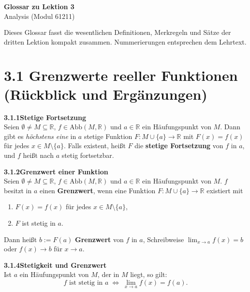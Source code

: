 \documentclass[a4paper,12pt]{article}
\newcommand{\gentry}[3]{%
  \noindent\textbf{#1\quad #2}\nopagebreak\\[0.2em]
  #3\par\smallskip
}
\begin{document}
\begin{center}
  {\LARGE\bfseries Glossar zu Lektion 3}\\[0.5em]
  {\large Analysis (Modul 61211)}
\end{center}

\vspace{1em}

Dieses Glossar fasst die wesentlichen Definitionen, Merkregeln und S\"atze
der dritten Lektion kompakt zusammen. Nummerierungen entsprechen dem Lehrtext.

\section*{3.1 \quad Grenzwerte reeller Funktionen (R\"uckblick und Erg\"anzungen)}

\gentry{3.1.1}{Stetige Fortsetzung}{%
  Seien $\emptyset \neq M \subseteq \mathbb{R}$, $f \in \mathrm{Abb}(M, \mathbb{R})$ und
  $a \in \mathbb{R}$ ein H\"aufungspunkt von $M$. Dann gibt es \emph{h\"ochstens eine}
  in $a$ stetige Funktion $F : M \cup \{a\} \to \mathbb{R}$ mit
  $F(x) = f(x)$ f\"ur jedes $x \in M \setminus \{a\}$. Falls existent, hei{\ss}t $F$
  die \textbf{stetige Fortsetzung} von $f$ in $a$, und $f$ hei{\ss}t nach $a$
  stetig fortsetzbar.
}

\gentry{3.1.2}{Grenzwert einer Funktion}{%
  Seien $\emptyset \neq M \subseteq \mathbb{R}$, $f \in \mathrm{Abb}(M, \mathbb{R})$ und
  $a \in \mathbb{R}$ ein H\"aufungspunkt von $M$. $f$ besitzt in $a$ einen
  \textbf{Grenzwert}, wenn eine Funktion $F : M \cup \{a\} \to \mathbb{R}$ existiert mit
  \begin{enumerate}[label=(\roman*),topsep=2pt,itemsep=1pt]
    \item $F(x) = f(x)$ f\"ur jedes $x \in M \setminus \{a\}$,
    \item $F$ ist stetig in $a$.
  \end{enumerate}
  Dann hei{\ss}t $b := F(a)$ \textbf{Grenzwert} von $f$ in $a$, Schreibweise
  $\lim_{x \to a} f(x) = b$ oder $f(x) \to b$ f\"ur $x \to a$.
}

\gentry{3.1.4}{Stetigkeit und Grenzwert}{%
  Ist $a$ ein H\"aufungspunkt von $M$, der in $M$ liegt, so gilt:
  \[
    f \text{ ist stetig in } a \;\Longleftrightarrow\; \lim_{x \to a} f(x) = f(a).
  \]
}
\end{document}
